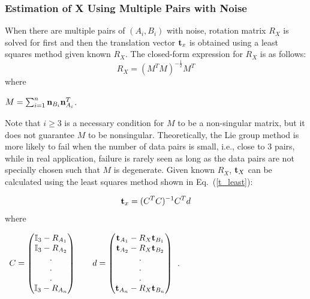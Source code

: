 \documentclass[twocolumn,10pt]{asme2ej}
\newcommand{\nn}{{\bf n}}
\newcommand{\ttt}{{\bf t}}
\begin{document}
\subsubsection{Estimation of X Using Multiple Pairs with Noise}
When there are multiple pairs of $(A_{i}, B_{i})$ with noise, rotation matrix $R_{X}$ is solved for first and then the translation vector $\ttt_{x}$ is obtained using a least squares method given known $R_{X}$. The closed-form expression for $R_{X}$ is as follows:
\begin{equation}
R_{X} = (M^{T}M)^{-\frac{1}{2}}M^{T}
\end{equation}
where \\
\begin{center}
$M = \sum_{i=1}^{n}{\nn_{B_{i}} \nn_{A_{i}}^{T}}$.
\end{center}
Note that $i \geq 3$ is a necessary condition for $M$ to be a non-singular matrix, but it does not guarantee $M$ to be nonsingular. Theoretically, the Lie group method is more likely to fail when the number of data pairs is small, i.e., close to 3 pairs,  while in real application, failure is rarely %
seen as long as the data pairs are not specially chosen such that $M$ is degenerate. Given known $R_{X}$, $\ttt_{X}$ can be calculated using the least squares method shown in Eq.~(\ref{t_least}):

\begin{equation}
\ttt_{x} = (C^{T}C)^{-1}C^{T}d
\label{t_least}
\end{equation}
where\\

\begin{center}
$\begin{array}{lr}
C = \begin{pmatrix}
\mathbb{I}_{3} - R_{{A_{1}}}\\
\mathbb{I}_{3} - R_{{A_{2}}}\\
.\\
.\\
.\\
\mathbb{I}_{3} - R_{{A_{n}}}\\
\end{pmatrix}
\; \; 
& \; \;
d = \begin{pmatrix}
\ttt_{A_{1}} - R_{X}\ttt_{B_{1}}\\
\ttt_{A_{2}} - R_{X}\ttt_{B_{2}}\\.\\
.\\
.\\
\ttt_{A_{n}} - R_{X}\ttt_{B_{n}}\\\end{pmatrix} 
\end{array}$.
\end{center}
\end{document}
